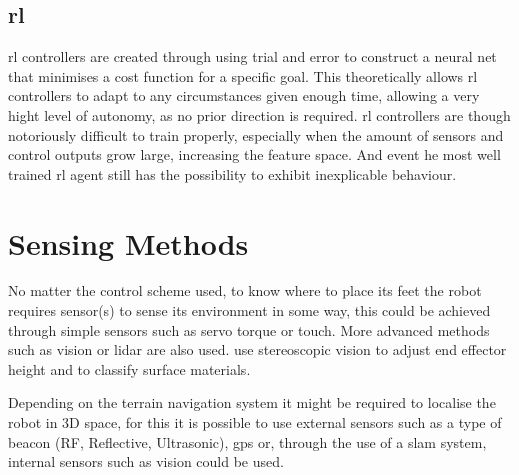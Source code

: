     \subsection{\acl{rl}}
    \ac{rl} controllers are created through using trial and error to construct a neural net that minimises a cost function for a specific goal. This theoretically allows \ac{rl} controllers to adapt to any circumstances given enough time, allowing a very hight level of autonomy, as no prior direction is required. \ac{rl} controllers are though notoriously difficult to train properly, especially when the amount of sensors and control outputs grow large, increasing the feature space. And event he most well trained \ac{rl} agent still has the possibility to exhibit inexplicable behaviour.
    
\section{Sensing Methods}
    No matter the control scheme used, to know where to place its feet the robot requires sensor(s) to sense its environment in some way, this could be achieved through simple sensors such as servo torque or touch. More advanced methods such as vision or \ac{lidar} are also used. \cite{homberger2017terrain} use stereoscopic vision to adjust end effector height and to classify surface materials.

    Depending on the terrain navigation system it might be required to localise the robot in 3D space, for this it is possible to use external sensors such as a type of beacon (RF, Reflective, Ultrasonic), \ac{gps} or, through the use of a \ac{slam} system, internal sensors such as vision could be used.




